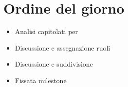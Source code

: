 \section{Ordine del giorno}
\begin{itemize}
	\item Analisi capitolati per \SdF{}
	\item Discussione e assegnazione ruoli
	\item Discussione e suddivisione \NdP{}
	\item Fissata milestone
\end{itemize}
